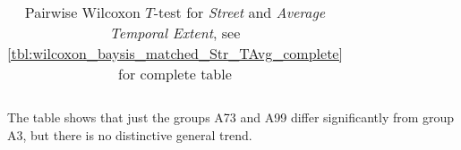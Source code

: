 \begin{table}[ht!]
\begin{tabular}{rrrrrrrrrrrrrrrrr}
		\bottomrule
	\end{tabular}
	\caption{Pairwise Wilcoxon $T$-test for \textit{Street} and \textit{Average Temporal Extent}, see \cref{tbl:wilcoxon_baysis_matched_Str_TAvg_complete} for complete table}
	\label{tbl:wilcoxon_baysis_matched_Str_TAvg}
\end{table}
The table shows that just the groups A73 and A99 differ significantly from group A3, but there is no distinctive general trend.
